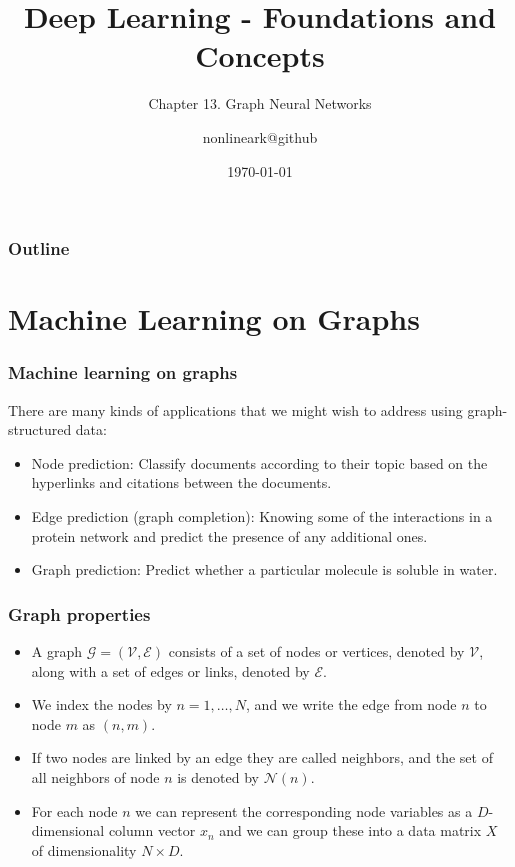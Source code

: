 \documentclass{beamer}
\title{Deep Learning - Foundations and Concepts}
\subtitle{Chapter 13. Graph Neural Networks}
\author{nonlineark@github}
\date{\today}
\begin{document}
\begin{frame}
    \titlepage
\end{frame}

\begin{frame}
    \frametitle{Outline}
    \tableofcontents
\end{frame}

\section{Machine Learning on Graphs}

\begin{frame}
    \frametitle{Machine learning on graphs}
    There are many kinds of applications that we might wish to address using graph-structured data:
    \begin{itemize}
        \item Node prediction: Classify documents according to their topic based on the hyperlinks and citations between the documents.
        \item Edge prediction (graph completion): Knowing some of the interactions in a protein network and predict the presence of any additional ones.
        \item Graph prediction: Predict whether a particular molecule is soluble in water.
    \end{itemize}
\end{frame}

\begin{frame}
    \frametitle{Graph properties}
    \begin{itemize}
        \item A graph $\mathcal{G}=(\mathcal{V},\mathcal{E})$ consists of a set of nodes or vertices, denoted by $\mathcal{V}$, along with a set of edges or links, denoted by $\mathcal{E}$.
        \item We index the nodes by $n=1,\hdots,N$, and we write the edge from node $n$ to node $m$ as $(n,m)$.
        \item If two nodes are linked by an edge they are called neighbors, and the set of all neighbors of node $n$ is denoted by $\mathcal{N}(n)$.
        \item For each node $n$ we can represent the corresponding node variables as a $D$-dimensional column vector $x_{n}$ and we can group these into a data matrix $X$ of dimensionality $N\times{}D$.
    \end{itemize}
\end{frame}
\end{document}
